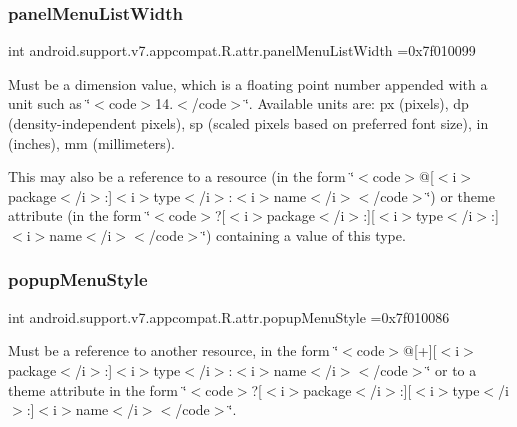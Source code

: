 \subsubsection{\texorpdfstring{panel\+Menu\+List\+Width}{panelMenuListWidth}}
{\footnotesize\ttfamily int android.\+support.\+v7.\+appcompat.\+R.\+attr.\+panel\+Menu\+List\+Width =0x7f010099\hspace{0.3cm}{\ttfamily [static]}}

Must be a dimension value, which is a floating point number appended with a unit such as \char`\"{}$<$code$>$14.\+5sp$<$/code$>$\char`\"{}. Available units are\+: px (pixels), dp (density-\/independent pixels), sp (scaled pixels based on preferred font size), in (inches), mm (millimeters). 

This may also be a reference to a resource (in the form \char`\"{}$<$code$>$@\mbox{[}$<$i$>$package$<$/i$>$\+:\mbox{]}$<$i$>$type$<$/i$>$\+:$<$i$>$name$<$/i$>$$<$/code$>$\char`\"{}) or theme attribute (in the form \char`\"{}$<$code$>$?\mbox{[}$<$i$>$package$<$/i$>$\+:\mbox{]}\mbox{[}$<$i$>$type$<$/i$>$\+:\mbox{]}$<$i$>$name$<$/i$>$$<$/code$>$\char`\"{}) containing a value of this type. \mbox{\label{classandroid_1_1support_1_1v7_1_1appcompat_1_1R_1_1attr_adaf268c570b00062a1054b7f97f96b38}} 
\subsubsection{\texorpdfstring{popup\+Menu\+Style}{popupMenuStyle}}
{\footnotesize\ttfamily int android.\+support.\+v7.\+appcompat.\+R.\+attr.\+popup\+Menu\+Style =0x7f010086\hspace{0.3cm}{\ttfamily [static]}}

Must be a reference to another resource, in the form \char`\"{}$<$code$>$@\mbox{[}+\mbox{]}\mbox{[}$<$i$>$package$<$/i$>$\+:\mbox{]}$<$i$>$type$<$/i$>$\+:$<$i$>$name$<$/i$>$$<$/code$>$\char`\"{} or to a theme attribute in the form \char`\"{}$<$code$>$?\mbox{[}$<$i$>$package$<$/i$>$\+:\mbox{]}\mbox{[}$<$i$>$type$<$/i$>$\+:\mbox{]}$<$i$>$name$<$/i$>$$<$/code$>$\char`\"{}. \mbox{\label{classandroid_1_1support_1_1v7_1_1appcompat_1_1R_1_1attr_a7163bdfa188237fc5f6cb7ec583125e4}} 
